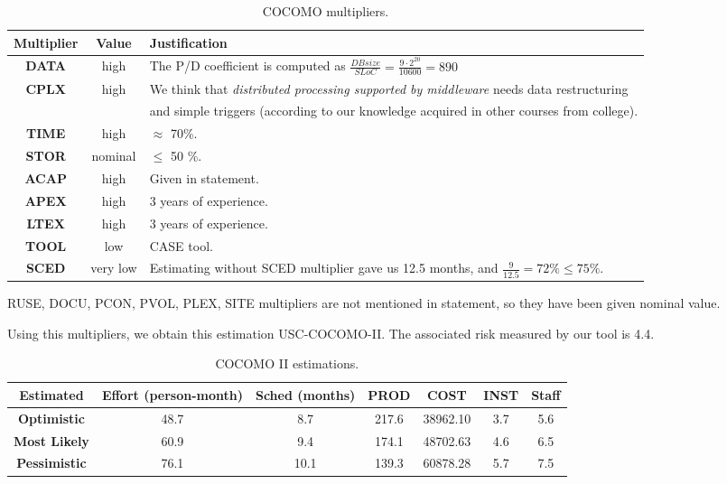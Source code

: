 \begin{table}[hbtp]
\centering
\begin{tabular}{|c|c|p{10cm}|}
\hline
\textbf{Multiplier} & \textbf{Value} & \textbf{Justification} \\ \hline
\textbf{DATA} & high & The P/D coefficient is computed as $\frac{DB size}{SLoC} = \frac{9 · 2^{20}}{10600} = 890$ \vspace{3pt} \\ \hline
\textbf{CPLX} & high & We think that \textit{distributed processing supported by middleware} needs data restructuring\\ & & and simple triggers (according to our knowledge acquired in other courses from college). \\ \hline
\textbf{TIME} & high & $\approx$ 70\%.  \\ \hline
\textbf{STOR} & nominal & $\leq$ 50 \%. \\ \hline
\textbf{ACAP} & high & Given in statement. \\ \hline
\textbf{APEX} & high & 3 years of experience. \\ \hline
\textbf{LTEX} & high & 3 years of experience. \\ \hline
\textbf{TOOL} & low & CASE tool. \\ \hline
\textbf{SCED} & very low & Estimating without SCED multiplier gave us 12.5 months, and $\frac{9}{12.5}=72\% \leq 75\%$.  \vspace{3pt} \\\hline
\end{tabular}
\caption{COCOMO multipliers.}
\label{tblMultipliersProblem2}
\end{table}

RUSE, DOCU, PCON, PVOL, PLEX, SITE multipliers are not mentioned in statement, so they have been given nominal value.


Using this multipliers, we obtain this estimation USC-COCOMO-II. The associated risk measured by our tool is 4.4.

\begin{table}[hbtp]
\centering
\begin{tabular}{|c||c|c|c|c|c|c|}
\hline
\textbf{Estimated} & \textbf{Effort (person-month)} & \textbf{Sched (months)} & \textbf{PROD} & \textbf{COST} & \textbf{INST} & \textbf{Staff} \\ \hline
\textbf{Optimistic} & 48.7 & 8.7 & 217.6 & 38962.10 & 3.7 & 5.6 \\
\textbf{Most Likely} & 60.9 & 9.4 & 174.1 & 48702.63 & 4.6 & 6.5 \\
\textbf{Pessimistic} & 76.1 & 10.1 & 139.3 & 60878.28 & 5.7 & 7.5 \\ \hline
\end{tabular}
\label{tbl_Problem2}
\caption{COCOMO II estimations.}
\end{table}

